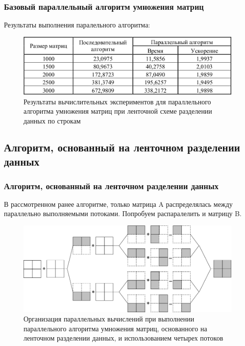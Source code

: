 \documentclass{beamer}
\begin{document}

\begin{frame}
\frametitle{Базовый параллельный алгоритм умножения матриц}

Результаты выполнения паралельного алгоритма:

\begin{figure}
\includegraphics[scale=0.28]{res/pic007}
\caption{Результаты вычислительных экспериментов для параллельного алгоритма умножения
матриц при ленточной схеме разделении данных по строкам}
\end{figure}

\end{frame}


\subsection{Алгоритм, основанный на ленточном разделении данных}

\begin{frame}
\frametitle{Алгоритм, основанный на ленточном разделении данных}

В рассмотренном ранее алгоритме, только матрица A распределялась между параллельно выполняемыми потоками. Попробуем распаралелить и матрицу B.

\begin{figure}
\includegraphics[scale=0.28]{res/pic008}
\caption{Организация параллельных вычислений при выполнении параллельного алгоритма умножения матриц, основанного на ленточном разделении данных, и использованием четырех потоков}
\end{figure}

\end{frame}
\end{document}
